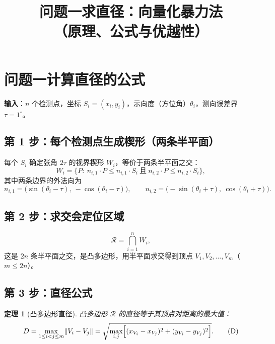 \documentclass[11pt,a4paper]{ctexart}
\title{\bfseries 问题一求直径：向量化暴力法\\（原理、公式与优越性）}
\author{}
\date{}
\newtheorem{theorem}{定理}
\begin{document}
\maketitle
\vspace{-2.2em}

\section{问题一计算直径的公式}

\textbf{输入}：$n$ 个检测点，坐标 $S_i=(x_i,y_i)$，示向度（方位角）$\theta_i$，测向误差界
$\tau=1^\circ$。

\subsection{第 1 步：每个检测点生成楔形（两条半平面）}

每个 $S_i$ 确定张角 $2\tau$ 的视界楔形 $W_i$，等价于两条半平面之交：
\begin{equation}
W_i=\bigl\{P:\ n_{i,1}\cdot P\le n_{i,1}\cdot S_i\ \text{且}\ n_{i,2}\cdot P\le n_{i,2}\cdot S_i\bigr\},
\end{equation}
其中两条边界的外法向为
\begin{equation}
n_{i,1}=\bigl(\sin(\theta_i-\tau),\ -\cos(\theta_i-\tau)\bigr),\qquad
n_{i,2}=\bigl(-\sin(\theta_i+\tau),\ \cos(\theta_i+\tau)\bigr).
\end{equation}

\subsection{第 2 步：求交会定位区域}

\begin{equation}
\mathcal R=\bigcap_{i=1}^{n}W_i,
\end{equation}
这是 $2n$ 条半平面之交，是凸多边形，用半平面求交得到顶点 $V_1,V_2,\dots,V_m$（$m\le 2n$）。

\subsection{第 3 步：直径公式}

\begin{theorem}[凸多边形直径]
凸多边形 $\mathcal R$ 的直径等于其顶点对距离的最大值：
\begin{equation}
D=\max_{1\le i<j\le m}\lVert V_i-V_j\rVert
=\sqrt{\max_{i,j}\Bigl[(x_{V_i}-x_{V_j})^2+(y_{V_i}-y_{V_j})^2\Bigr]} .
\tag{D}
\end{equation}
\end{theorem}
\end{document}

